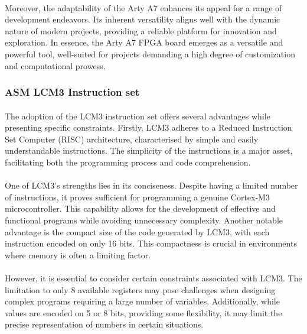 \documentclass{article}
\begin{document}
\paragraph{}Moreover, the adaptability of the Arty A7 enhances its appeal for a range of development endeavors. Its inherent versatility aligns well with the dynamic nature of modern projects, providing a reliable platform for innovation and exploration. In essence, the Arty A7 FPGA board emerges as a versatile and powerful tool, well-suited for projects demanding a high degree of customization and computational prowess.

\subsubsection{ASM LCM3 Instruction set}

\paragraph{}The adoption of the LCM3 instruction set offers several advantages while presenting specific constraints. Firstly, LCM3 adheres to a Reduced Instruction Set Computer (RISC) architecture, characterised by simple and easily understandable instructions. The simplicity of the instructions is a major asset, facilitating both the programming process and code comprehension.

\paragraph{}One of LCM3's strengths lies in its conciseness. Despite having a limited number of instructions, it proves sufficient for programming a genuine Cortex-M3 microcontroller. This capability allows for the development of effective and functional programs while avoiding unnecessary complexity.
Another notable advantage is the compact size of the code generated by LCM3, with each instruction encoded on only 16 bits. This compactness is crucial in environments where memory is often a limiting factor.

\paragraph{}However, it is essential to consider certain constraints associated with LCM3. The limitation to only 8 available registers may pose challenges when designing complex programs requiring a large number of variables. Additionally, while values are encoded on 5 or 8 bits, providing some flexibility, it may limit the precise representation of numbers in certain situations.
\end{document}
